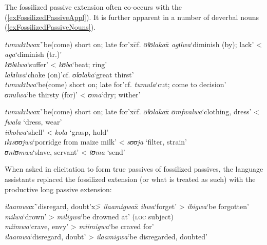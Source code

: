 The fossilized passive extension often co-occurs with the  (\ref{exFossilizedPassiveAppl}). It is further apparent in a number of deverbal nouns (\ref{exFossilizedPassiveNouns}).
\begin{exe}
\ex\label{exFossilizedPassiveAppl}
\begin{tabbing}
\textit{tumukɪlwa}x\=`be(come) short on; late for'x\=cf. \textit{ʊlʊlaka}x\=\kill%
\textit{agɪlwa}\>`diminish (by); lack'\> < \textit{aga}\>`diminish (tr.)'\\
\textit{kʊbɪlwa}\>`suffer'\> < \textit{kʊba}\>`beat; ring'\\
\textit{lakɪlwa}\>`choke (on)'\>cf. \textit{ʊlʊlaka}\>`great thirst'\\
\textit{tumukɪlwa}\>`be(come) short on; late for'\>cf. \textit{tumula}\>`cut; come to decision'\\
\textit{ʊmɪlwa}\>`be thirsty (for)'\> < \textit{ʊma}\>`dry; wither'
\end{tabbing}
\ex \label{exFossilizedPassiveNouns} \begin{tabbing}
\textit{tumukɪlwa}x\=`be(come) short on; late for'x\=cf. \textit{ʊlʊlaka}x\=\kill%
\textit{ʊmfwalwa}\>\lq clothing, dress'\> < \textit{fwala} \> \lq dress, wear'\\
\textit{iikolwa}\>\lq shell' \> < \textit{kola} \> \lq grasp, hold'\\
\textit{ɪkɪsʊʊjwa}\>\lq porridge from maize milk'\> < \textit{sʊʊja} \> \lq filter, strain'\\
\textit{ʊntʊmwa}\>\lq slave, servant'\> < \textit{tʊma}\> \lq send'
\end{tabbing}
\end{exe}

When asked in elicitation to form true passives of fossilized passives, the language assistants replaced the fossilized extension (or what is treated as such) with the productive long passive extension:
\begin{exe}
\ex
\begin{tabbing}
\textit{ilaamwa}x\=`disregard, doubt'x\=> \textit{ilaamigwa}x\=\kill
\textit{ibwa}\>`forget'\> > \textit{ibigwa}\>`be forgotten'\\
\textit{milwa}\>`drown'\> > \textit{miligwa}\>`be drowned at' (\textsc{loc} subject)
\\\textit{miimwa}\>`crave, envy'\> > \textit{miimigwa}\>`be craved for'\\
\textit{ilaamwa}\>`disregard, doubt'\> > \textit{ilaamigwa}\>`be disregarded, doubted'
\end{tabbing}
\end{exe}

